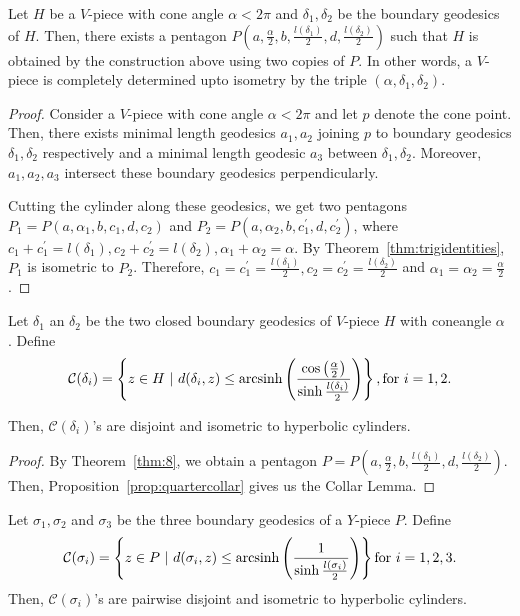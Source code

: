 \begin{theorem}
	\label{thm:8}
	Let $H$ be a $V$-piece with cone angle $\alpha < 2 \pi$ and $\delta_1, \delta_2$ be the boundary geodesics of $H$. Then, there exists a pentagon $P(a,\frac{\alpha}{2},b,\frac{l(\delta_1)}{2},d,\frac{l(\delta_2)}{2})$ such that $H$ is obtained by the construction above using two copies of $P$. In other words, a $V$-piece is completely determined upto isometry by the triple $(\alpha, \delta_1,\delta_2)$. 
\end{theorem}
\begin{proof}
	Consider a $V$-piece with cone angle $\alpha < 2\pi$ and let $p$ denote the cone point. Then, there exists minimal length geodesics $a_1,a_2$ joining $p$ to boundary geodesics $\delta_1, \delta_2$ respectively and a minimal length geodesic $a_3$ between $\delta_1, \delta_2$. Moreover, $a_1,a_2,a_3$ intersect these boundary geodesics perpendicularly.
	
	Cutting the cylinder along these geodesics, we get two pentagons $P_1 = P(a,\alpha_1,b,c_1,d,c_2)$ and $P_2 = P(a,\alpha_2,b,c_1^\prime,d,c_2^\prime)$, where $c_1+ c_1^\prime = l(\delta_1), c_2  + c_2^\prime = l(\delta_2) , \alpha_1 + \alpha_2 = \alpha$. By Theorem~\ref{thm:trigidentities}, $P_1$ is isometric to $P_2$. Therefore, $c_1 = c_1^\prime = \frac{l(\delta_1)}{2}, c_2 = c_2^\prime = \frac{l(\delta_2)}{2}$ and $\alpha_1 = \alpha_2 = \frac{\alpha}{2}$.
\end{proof}

\begin{lem}
	\label{lem:collarlemmaV}
	Let $\delta_ 1$ an $\delta_2$ be the two closed boundary geodesics of $V$-piece $H$ with coneangle $\alpha$ . Define
	$$\mathcal{C}(\delta_i)=\left\{z \in H ~ | ~ d(\delta_i,z) \leq \textup{arcsinh}\left(\frac{\cos\left(\frac{\alpha}{2} \right)}{\sinh{\frac{l(\delta_i)}{2}}}\right) \right\}, \textup{for } i = 1, 2.$$
	
	Then, $\mathcal{C}(\delta_i)$'s are disjoint and isometric to hyperbolic cylinders.
\end{lem}
\begin{proof}
	By Theorem~\ref{thm:8}, we obtain a pentagon $P = P(a,\frac{\alpha}{2},b,\frac{l(\delta_1)}{2},d,\frac{l(\delta_2)}{2})$. Then, Proposition~\ref{prop:quartercollar} gives us the Collar Lemma.
\end{proof}

\begin{lem}\cite[Proposition 3.1.8]{BM}
	\label{lem:collarlemmaY} Let $\sigma_1, \sigma_2$ and $\sigma_3$ be the three boundary geodesics of a $Y$-piece $P$. Define
		$$\mathcal{C}(\sigma_i)=\left\{z \in P ~\vert~ d(\sigma_i, z) \leq \textup{arcsinh}\left(\frac{1}{\sinh{\frac{l(\sigma_i)}{2} }}\right)\right\} \textup{for } i= 1,2,3.$$	
		Then, $\mathcal{C}(\sigma_i)$'s are pairwise disjoint and isometric to hyperbolic cylinders.
\end{lem}
